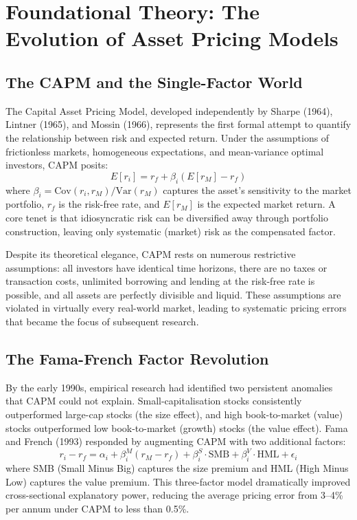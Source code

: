 \documentclass[conference]{IEEEtran}
\begin{document}
\section{Foundational Theory: The Evolution of Asset Pricing Models}

\subsection{The CAPM and the Single-Factor World}
The Capital Asset Pricing Model, developed independently by Sharpe (1964), Lintner (1965), and Mossin (1966), represents the first formal attempt to quantify the relationship between risk and expected return. Under the assumptions of frictionless markets, homogeneous expectations, and mean-variance optimal investors, CAPM posits:
\begin{equation}
E[r_i] = r_f + \beta_i \left( E[r_M] - r_f \right)
\end{equation}
where $\beta_i = \text{Cov}(r_i, r_M) / \text{Var}(r_M)$ captures the asset's sensitivity to the market portfolio, $r_f$ is the risk-free rate, and $E[r_M]$ is the expected market return. A core tenet is that idiosyncratic risk can be diversified away through portfolio construction, leaving only systematic (market) risk as the compensated factor.

Despite its theoretical elegance, CAPM rests on numerous restrictive assumptions: all investors have identical time horizons, there are no taxes or transaction costs, unlimited borrowing and lending at the risk-free rate is possible, and all assets are perfectly divisible and liquid. These assumptions are violated in virtually every real-world market, leading to systematic pricing errors that became the focus of subsequent research.

\subsection{The Fama-French Factor Revolution}
By the early 1990s, empirical research had identified two persistent anomalies that CAPM could not explain. Small-capitalisation stocks consistently outperformed large-cap stocks (the size effect), and high book-to-market (value) stocks outperformed low book-to-market (growth) stocks (the value effect). Fama and French (1993) responded by augmenting CAPM with two additional factors:
\begin{equation}
r_i - r_f = \alpha_i + \beta_i^M (r_M - r_f) + \beta_i^S \cdot \text{SMB} + \beta_i^V \cdot \text{HML} + \epsilon_i
\end{equation}
where SMB (Small Minus Big) captures the size premium and HML (High Minus Low) captures the value premium. This three-factor model dramatically improved cross-sectional explanatory power, reducing the average pricing error from 3--4\% per annum under CAPM to less than 0.5\%.
\end{document}
